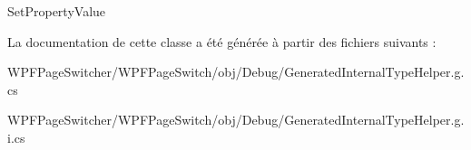 Set\+Property\+Value 



La documentation de cette classe a été générée à partir des fichiers suivants \+:\begin{DoxyCompactItemize}
\item 
W\+P\+F\+Page\+Switcher/\+W\+P\+F\+Page\+Switch/obj/\+Debug/Generated\+Internal\+Type\+Helper.\+g.\+cs\item 
W\+P\+F\+Page\+Switcher/\+W\+P\+F\+Page\+Switch/obj/\+Debug/Generated\+Internal\+Type\+Helper.\+g.\+i.\+cs\end{DoxyCompactItemize}
